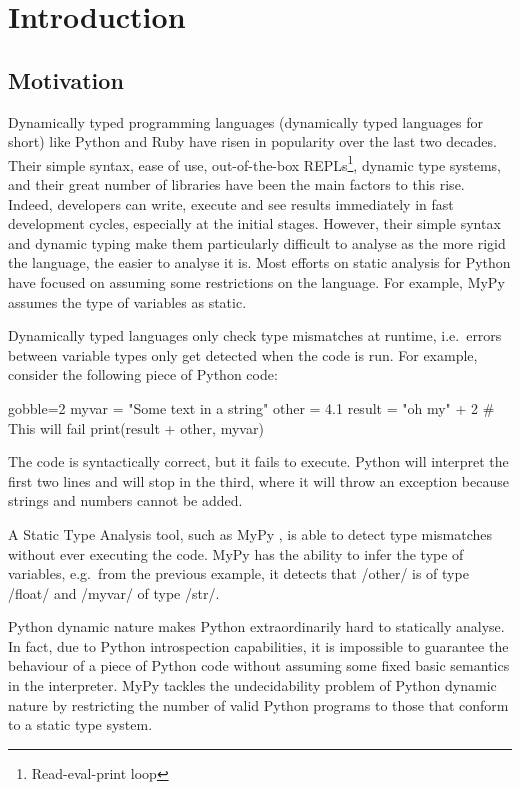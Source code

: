 \chapter{Introduction}\label{introduction}

\section{Motivation}\label{motivation}

Dynamically typed programming languages (dynamically typed languages for short) like
Python and Ruby have risen in popularity over the last two decades. Their simple syntax,
ease of use, out-of-the-box REPLs\footnote{Read-eval-print loop}, dynamic type systems,
and their great number of libraries have been the main factors to this rise. Indeed,
developers can  write, execute and see results immediately in fast development cycles,
especially at the initial stages. However, their simple syntax and dynamic typing make
them particularly difficult to analyse as the more rigid the language, the easier to
analyse it is. Most efforts on static analysis for Python have focused on assuming some
restrictions on the language. For example, MyPy \autocite{lehtosalo2016mypy} assumes the
type of variables as static.

Dynamically typed languages only check type mismatches at runtime, i.e.~errors between
variable types only get detected when the code is run. For example,
consider the following piece of Python code:

\begin{pythoncode*}{gobble=2}
  myvar = "Some text in a string"
  other = 4.1
  result = "oh my" + 2  # This will fail
  print(result + other, myvar)
\end{pythoncode*}

The code is syntactically correct, but it fails to execute. Python will interpret the first
two lines and will stop in the third, where it will throw an exception because strings
and numbers cannot be added.

A Static Type Analysis tool, such as MyPy \autocite{lehtosalo2016mypy}, is able to detect
type mismatches without ever executing the code.  MyPy has the ability to infer the type
of variables, e.g.~from the previous example, it detects that \pycode/other/ is of type
\pycode/float/ and \pycode/myvar/ of type \pycode/str/.

Python dynamic nature makes Python extraordinarily hard to statically analyse. In fact,
due to Python introspection capabilities, it is impossible to guarantee the behaviour of a
piece of Python code without assuming some fixed basic semantics in the interpreter.  MyPy
tackles the undecidability problem of Python dynamic nature by restricting the number
of valid Python programs to those that conform to a static type system\footnotemark.

